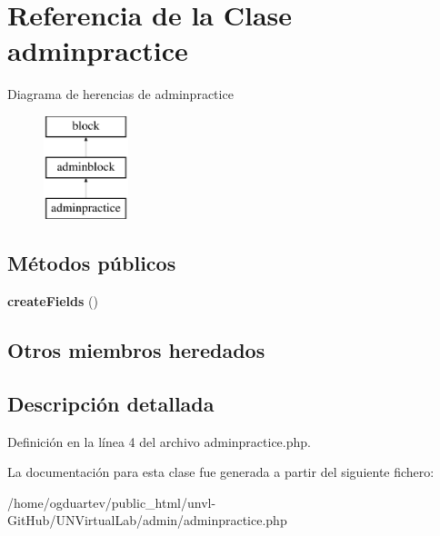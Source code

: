 \hypertarget{classadminpractice}{}\section{Referencia de la Clase adminpractice}
\label{classadminpractice}
Diagrama de herencias de adminpractice\begin{figure}[H]
\begin{center}
\leavevmode
\includegraphics[height=3.000000cm]{classadminpractice}
\end{center}
\end{figure}
\subsection*{Métodos públicos}
\begin{DoxyCompactItemize}
\item 
\mbox{\label{classadminpractice_a515878cf8a80e619382e2b0e142353db}} 
{\bfseries create\+Fields} ()
\end{DoxyCompactItemize}
\subsection*{Otros miembros heredados}


\subsection{Descripción detallada}


Definición en la línea 4 del archivo adminpractice.\+php.



La documentación para esta clase fue generada a partir del siguiente fichero\+:\begin{DoxyCompactItemize}
\item 
/home/ogduartev/public\+\_\+html/unvl-\/\+Git\+Hub/\+U\+N\+Virtual\+Lab/admin/adminpractice.\+php\end{DoxyCompactItemize}
